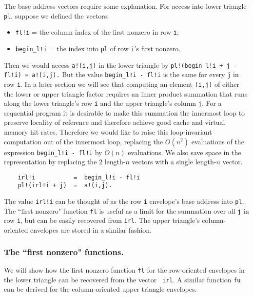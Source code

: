     The base address vectors require some explanation.  For  access into
lower triangle {\tt pl}, suppose we defined the vectors:
\begin{itemize}
\item   {\tt fl!i} = the column index of the first nonzero in row {\tt i};
\item   {\tt begin\_l!i} = the index into {\tt pl} of row {\tt i}'s first
        nonzero.
\end{itemize}
Then we would access {\tt a!(i,j)} in the lower triangle by
{\tt pl!(begin\_l!i + j - fl!i)  =  a!(i,j).}
But the value {\tt begin\_l!i - fl!i} is the same for every {\tt j}
in row {\tt i}.  In a later section we will see that computing an element
{\tt (i,j)} of either the lower or upper triangle factor requires an
inner product summation that runs along the lower triangle's row {\tt i}
and the upper triangle's column {\tt j}.  For a sequential program
it is desirable to make this summation the innermost loop to preserve
locality of reference and therefore achieve good cache and virtual
memory hit rates.  Therefore we would like to raise this
loop-invariant computation out of the innermost loop,
replacing the $O(n^2)$ evaluations of the expression
{\tt begin\_l!i - fl!i} by $O(n)$ evaluations.
We also save space in the representation
by replacing the $2$ length-$n$ vectors with a single length-$n$ vector.
\begin{verbatim}
    irl!i           =  begin_l!i - fl!i
    pl!(irl!i + j)  =  a!(i,j).
\end{verbatim}
The value {\tt irl!i} can be thought of as the row {\tt i} envelope's
base address into {\tt pl}.  The ``first nonzero" function {\tt fl} is
useful as a limit for the summation over all {\tt j} in row {\tt i},
but can be easily recovered from {\tt irl}. The upper triangle's
column-oriented envelopes are stored in a similar fashion.

\subsubsection{The ``first nonzero" functions.}

We will show how the first nonzero function {\tt fl} for the row-oriented
envelopes in the lower triangle can be recovered from the vector {\tt  
irl}.
A similar function {\tt fu} can be derived for the column-oriented
upper triangle envelopes.

